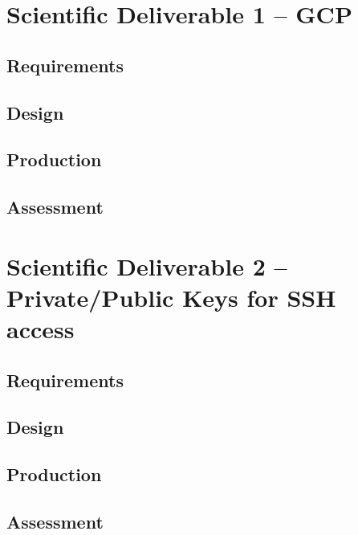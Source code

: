 \section{Scientific Deliverable 1 -- GCP}
% 
\subsection{Requirements}%

\subsection{Design}%

\subsection{Production}%

\subsection{Assessment}%


\section{Scientific Deliverable 2 -- Private/Public Keys for SSH
access}
% 
\subsection{Requirements}%

\subsection{Design}%

\subsection{Production}%

\subsection{Assessment}%


